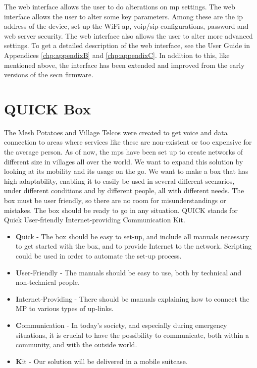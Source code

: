 The web interface allows the user to do alterations on \gls{mp} settings. The web interface allows the user to alter some key parameters. Among these are the \gls{ip} address of the device, set up the WiFi \gls{ap}, \gls{voip}/\gls{sip} configurations, password and web server security. The web interface also allows the user to alter more advanced settings. To get a detailed description of the web interface, see the User Guide in Appendices \ref{chp:appendixB} and \ref{chp:appendixC}. In addition to this, like mentioned above, the interface has been extended and improved from the early versions of the \gls{secn} firmware. 



\section{QUICK Box}
The Mesh Potatoes and Village Telcos were created to get voice and data connection to areas where services like these are non-existent or too expensive for the average person. As of now, the \glspl{mp} have been set up to create networks of different size in villages all over the world. We want to expand this solution by looking at its mobility and its usage on the go. We want to make a box that has high adaptability, enabling it to easily be used in several different scenarios, under different conditions and by different people, all with different needs. The box must be user friendly, so there are no room for misunderstandings or mistakes. The box should be ready to go in any situation. QUICK stands for Quick User-friendly Internet-providing Communication Kit. 

\begin{itemize}
\item [] \textbf{Q}uick - The box should be easy to set-up, and include all manuals necessary to get started with the box, and to provide Internet to the network. Scripting could be used in order to automate the set-up process. 
\item [] \textbf{U}ser-Friendly - The manuals should be easy to use, both by technical and non-technical people. 
\item [] \textbf{I}nternet-Providing - There should be manuals explaining how to connect the MP to various types of up-links. 
\item [] \textbf{C}ommunication - In today's society, and especially during emergency situations, it is crucial to have the possibility to communicate, both within a community, and with the outside world.
\item [] \textbf{K}it - Our solution will be delivered in a mobile suitcase. 
\end{itemize}

